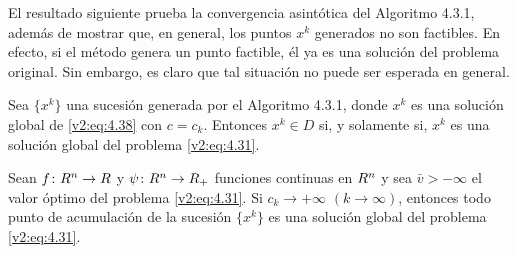 El resultado siguiente prueba la convergencia asintótica del Algoritmo 4.3.1, además de mostrar que, en general, los puntos $x^k$ generados no son factibles. En efecto, si el método genera un punto factible, él ya es una solución del problema original. Sin embargo, es claro que tal situación no puede ser esperada en general.

\begin{theorem}\label{v2:thm:4.3.1}
    Sea $\{x^k\}$ una sucesión generada por el Algoritmo 4.3.1, donde $x^k$ es una solución global de \eqref{v2:eq:4.38} con $c = c_k$. Entonces $x^k \in D$ si, y solamente si, $x^k$ es una solución global del problema \eqref{v2:eq:4.31}.

    Sean $f \colon R^n \to R$ y $\psi \colon R^n \to R_+$ funciones continuas en $R^n$ y sea $\bar{v} > -\infty$ el valor óptimo del problema \eqref{v2:eq:4.31}. Si $c_k \to +\infty$ $(k \to \infty)$, entonces todo punto de acumulación de la sucesión $\{x^k\}$ es una solución global del problema \eqref{v2:eq:4.31}.
\end{theorem}
